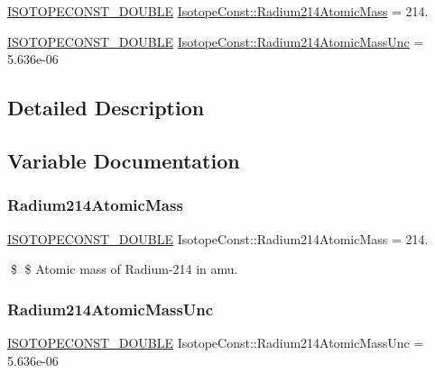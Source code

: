 \begin{DoxyCompactItemize}
\item 
\mbox{\hyperlink{group___isotope_const-_macros_ga8f45a7272ce02c0b4c65c44636ed719a}{I\+S\+O\+T\+O\+P\+E\+C\+O\+N\+S\+T\+\_\+\+D\+O\+U\+B\+LE}} \mbox{\hyperlink{group___isotope_const-_radium-_ra214_gaa83d8680e751f43cc06e6be5f503ec25}{Isotope\+Const\+::\+Radium214\+Atomic\+Mass}} = 214.
\item 
\mbox{\hyperlink{group___isotope_const-_macros_ga8f45a7272ce02c0b4c65c44636ed719a}{I\+S\+O\+T\+O\+P\+E\+C\+O\+N\+S\+T\+\_\+\+D\+O\+U\+B\+LE}} \mbox{\hyperlink{group___isotope_const-_radium-_ra214_gac58a8618645fc0f33bc377e284d2c7ed}{Isotope\+Const\+::\+Radium214\+Atomic\+Mass\+Unc}} = 5.\+636e-\/06
\end{DoxyCompactItemize}


\subsection{Detailed Description}


\subsection{Variable Documentation}
\mbox{\label{group___isotope_const-_radium-_ra214_gaa83d8680e751f43cc06e6be5f503ec25}} 
\subsubsection{\texorpdfstring{Radium214\+Atomic\+Mass}{Radium214AtomicMass}}
{\footnotesize\ttfamily \mbox{\hyperlink{group___isotope_const-_macros_ga8f45a7272ce02c0b4c65c44636ed719a}{I\+S\+O\+T\+O\+P\+E\+C\+O\+N\+S\+T\+\_\+\+D\+O\+U\+B\+LE}} Isotope\+Const\+::\+Radium214\+Atomic\+Mass = 214.}

\$ \$ Atomic mass of Radium-\/214 in amu. \mbox{\label{group___isotope_const-_radium-_ra214_gac58a8618645fc0f33bc377e284d2c7ed}} 
\subsubsection{\texorpdfstring{Radium214\+Atomic\+Mass\+Unc}{Radium214AtomicMassUnc}}
{\footnotesize\ttfamily \mbox{\hyperlink{group___isotope_const-_macros_ga8f45a7272ce02c0b4c65c44636ed719a}{I\+S\+O\+T\+O\+P\+E\+C\+O\+N\+S\+T\+\_\+\+D\+O\+U\+B\+LE}} Isotope\+Const\+::\+Radium214\+Atomic\+Mass\+Unc = 5.\+636e-\/06}

